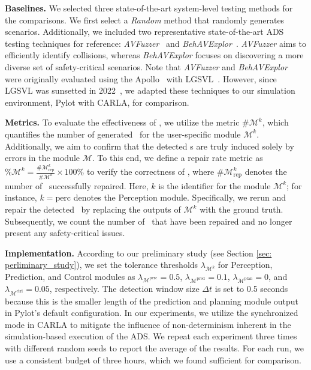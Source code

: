 \textbf{Baselines.}
We selected three state-of-the-art system-level testing methods for the comparisons. We first select a \textit{Random} method that randomly generates scenarios. Additionally, we included two representative state-of-the-art ADS testing techniques for reference: \textit{AVFuzzer}~\cite{li2020av} and \textit{BehAVExplor}~\cite{cheng2023behavexplor}. \textit{AVFuzzer} aims to efficiently identify collisions, whereas \textit{BehAVExplor} focuses on discovering a more diverse set of safety-critical scenarios. 
Note that \textit{AVFuzzer} and \textit{BehAVExplor} were originally evaluated using the Apollo~\cite{baiduapollo} with LGSVL~\cite{rong2020lgsvl}. However, since LGSVL was sunsetted in 2022~\cite{LGSVLSunsetting}, we adapted these techniques to our simulation environment, Pylot with CARLA, for comparison. 

\textbf{Metrics.} To evaluate the effectiveness of \tool, we utilize the metric $\#\mathcal{M}^{k}$, which quantifies the number of generated \mccs\ for the user-specific module $\mathcal{M}^{k}$. 
Additionally, we aim to confirm that the detected {\mccs}s are truly induced solely by errors in the module \( \mathcal{M} \). To this end, we define a repair rate metric as \( \%\mathcal{M}^{k} = \frac{\#\mathcal{M}^{k}_{\text{rep}}}{\#\mathcal{M}^{k}} \times 100\% \) to verify the correctness of \oracle, where \( \#\mathcal{M}^{k}_{\text{rep}} \) denotes the number of \mccs\ successfully repaired.
Here, $k$ is the identifier for the module $\mathcal{M}^{k}$; for instance, $k = \text{perc}$ denotes the Perception module. 
Specifically, we rerun and repair the detected \mccs\ by replacing the outputs of $\mathcal{M}^{k}$ with the ground truth. Subsequently, we count the number of \mccs\ that have been repaired and no longer present any safety-critical issues.


\textbf{Implementation.} 
According to our preliminary study (see Section \ref{sec: perliminary_study}), we set the tolerance thresholds $\lambda_{\mathcal{M}^k}$ for Perception, Prediction, and Control modules as $\lambda_{\mathcal{M}^{\text{perc}}} = 0.5$, $\lambda_{\mathcal{M}^{\text{pred}}} = 0.1$, $\lambda_{\mathcal{M}^{\text{plan}}} = 0$, and $\lambda_{\mathcal{M}^{\text{ctrl}}} = 0.05$, respectively. The detection window size $\Delta t$ is set to 0.5 seconds because this is the smaller length of the prediction and planning module output in Pylot's default configuration.
In our experiments, we utilize the synchronized mode in CARLA to mitigate the influence of non-determinism inherent in the simulation-based execution of the ADS. We repeat each experiment three times with different random seeds to report the average of the results. For each run, we use a consistent budget of three hours, which we found sufficient for comparison. 

